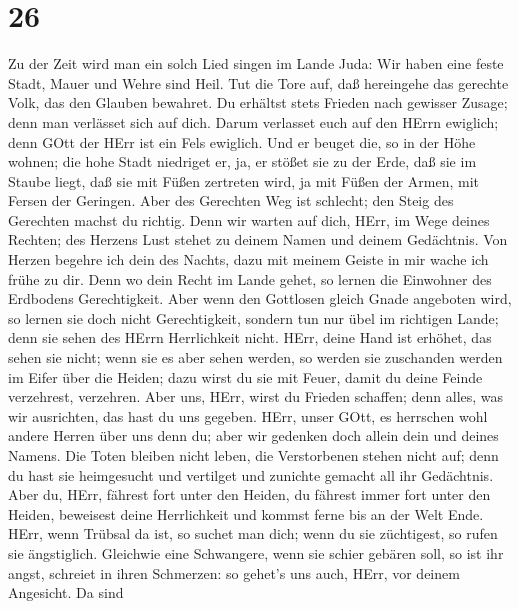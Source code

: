 \hypertarget{section-25}{%
\section{26}\label{section-25}}

 Zu der Zeit wird man ein solch Lied singen im Lande Juda:
Wir haben eine feste Stadt, Mauer und Wehre sind Heil.  Tut
die Tore auf, daß hereingehe das gerechte Volk, das den Glauben
bewahret.  Du erhältst stets Frieden nach gewisser Zusage;
denn man verlässet sich auf dich.  Darum verlasset euch auf
den HErrn ewiglich; denn GOtt der HErr ist ein Fels ewiglich.
 Und er beuget die, so in der Höhe wohnen; die hohe Stadt
niedriget er, ja, er stößet sie zu der Erde, daß sie im Staube liegt,
 daß sie mit Füßen zertreten wird, ja mit Füßen der Armen,
mit Fersen der Geringen.  Aber des Gerechten Weg ist
schlecht; den Steig des Gerechten machst du richtig.  Denn
wir warten auf dich, HErr, im Wege deines Rechten; des Herzens Lust
stehet zu deinem Namen und deinem Gedächtnis.  Von Herzen
begehre ich dein des Nachts, dazu mit meinem Geiste in mir wache ich
frühe zu dir. Denn wo dein Recht im Lande gehet, so lernen die Einwohner
des Erdbodens Gerechtigkeit.  Aber wenn den Gottlosen
gleich Gnade angeboten wird, so lernen sie doch nicht Gerechtigkeit,
sondern tun nur übel im richtigen Lande; denn sie sehen des HErrn
Herrlichkeit nicht.  HErr, deine Hand ist erhöhet, das
sehen sie nicht; wenn sie es aber sehen werden, so werden sie zuschanden
werden im Eifer über die Heiden; dazu wirst du sie mit Feuer, damit du
deine Feinde verzehrest, verzehren.  Aber uns, HErr, wirst
du Frieden schaffen; denn alles, was wir ausrichten, das hast du uns
gegeben.  HErr, unser GOtt, es herrschen wohl andere Herren
über uns denn du; aber wir gedenken doch allein dein und deines Namens.
 Die Toten bleiben nicht leben, die Verstorbenen stehen
nicht auf; denn du hast sie heimgesucht und vertilget und zunichte
gemacht all ihr Gedächtnis.  Aber du, HErr, fährest fort
unter den Heiden, du fährest immer fort unter den Heiden, beweisest
deine Herrlichkeit und kommst ferne bis an der Welt Ende. 
HErr, wenn Trübsal da ist, so suchet man dich; wenn du sie züchtigest,
so rufen sie ängstiglich.  Gleichwie eine Schwangere, wenn
sie schier gebären soll, so ist ihr angst, schreiet in ihren Schmerzen:
so gehet's uns auch, HErr, vor deinem Angesicht.  Da sind
